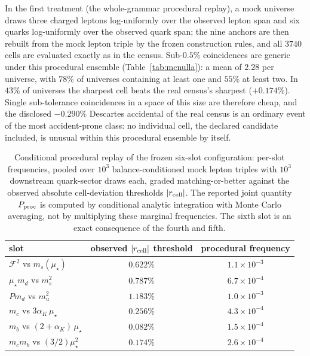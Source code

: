 \documentclass[aps,twocolumn,superscriptaddress,nofootinbib,floatfix]{revtex4-2}
\newcommand{\mstar}{\mu_\star}
\newcommand{\alphaK}{\alpha_K}
\begin{document}
In the first treatment (the whole-grammar procedural replay), a mock universe draws three
charged leptons log-uniformly over the observed lepton span and six quarks
log-uniformly over the observed quark span; the nine anchors are then rebuilt
from the mock lepton triple by the frozen construction rules, and all $3740$
cells are evaluated exactly as in the census. Sub-$0.5\%$ coincidences are
generic under this procedural ensemble (Table~\ref{tab:mcnulla}): a mean of $2.28$ per
universe, with $78\%$ of universes containing at least one and $55\%$ at
least two. In $43\%$ of universes the sharpest cell beats the real census's
sharpest ($+0.174\%$). Single sub-tolerance coincidences in a space of this
size are therefore cheap, and the disclosed $-0.290\%$ Descartes accidental
of the real census is an ordinary event of the most accident-prone class: no
individual cell, the declared candidate included, is unusual within this procedural ensemble by itself.

\begin{table}[t]
\caption{Conditional procedural replay of the frozen six-slot configuration: per-slot frequencies, pooled over $10^3$
balance-conditioned mock lepton triples with $10^3$ downstream quark-sector
draws each, graded matching-or-better against the observed absolute cell-deviation thresholds $|r_{\rm cell}|$. The reported joint quantity $P_{\rm proc}$ is computed by conditional analytic integration with Monte Carlo averaging, not by multiplying these marginal frequencies. The sixth slot is an exact consequence of the fourth and fifth.}
\label{tab:slots}
\begin{ruledtabular}
\begin{tabular}{lcc}
slot & observed $|r_{\rm cell}|$ threshold & procedural frequency \\
\hline
$\mathcal{F}^2$ vs $m_s(\mstar)$ & $0.622\%$ & $1.1\times10^{-3}$ \\
$\mstar m_d$ vs $m_s^2$ & $0.787\%$ & $6.7\times10^{-4}$ \\
$P m_d$ vs $m_u^2$ & $1.183\%$ & $1.0\times10^{-3}$ \\
$m_c$ vs $3\alphaK\,\mstar$ & $0.256\%$ & $4.3\times10^{-4}$ \\
$m_b$ vs $(2+\alphaK)\,\mstar$ & $0.082\%$ & $1.5\times10^{-4}$ \\
$m_c m_b$ vs $(3/2)\mstar^2$ & $0.174\%$ & $2.6\times10^{-4}$ \\
\end{tabular}
\end{ruledtabular}
\end{table}
\end{document}
